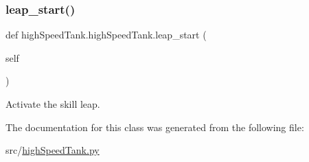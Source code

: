 \subsubsection{\texorpdfstring{leap\_start()}{leap\_start()}}
{\footnotesize\ttfamily def high\+Speed\+Tank.\+high\+Speed\+Tank.\+leap\+\_\+start (\begin{DoxyParamCaption}\item[{}]{self }\end{DoxyParamCaption})}



Activate the skill leap. 



The documentation for this class was generated from the following file\+:\begin{DoxyCompactItemize}
\item 
src/\mbox{\hyperlink{high_speed_tank_8py}{high\+Speed\+Tank.\+py}}\end{DoxyCompactItemize}
